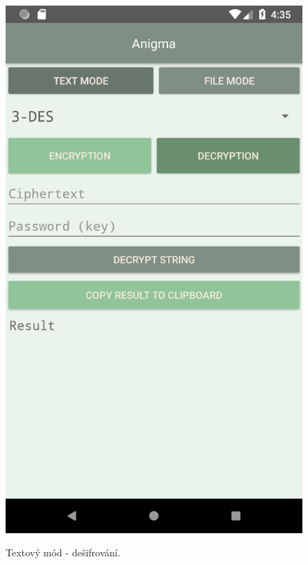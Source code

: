 \documentclass[12pt, a4paper]{article}
\begin{document}
\begin{figure}[h]
\caption{Textový mód - dešifrování.}
\centering
\includegraphics[height=0.4\textheight]{text_dec}
\label{fig:text_dec}
\end{figure}
\end{document}
